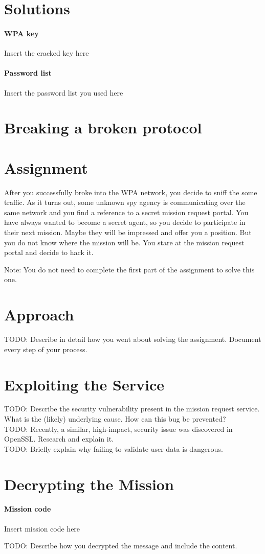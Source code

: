 \documentclass{scrartcl}
\newcommand\solution[2]{{\paragraph{#1}#2}}
\newcommand\todo[1]{TODO: #1}
\begin{document}
\section*{Solutions}
\solution{WPA key}{Insert the cracked key here}
\solution{Password list}{Insert the password list you used here}


\newpage

\section{Breaking a broken protocol}

\section*{Assignment}
After you successfully broke into the WPA network, you decide to sniff the some traffic.
As it turns out, some unknown spy agency is communicating over the same network and you find a 
reference to a secret mission request portal. You have always wanted to become a secret
agent, so you decide to participate in their next mission. Maybe they will be impressed and offer you a position.
But you do not know where the mission will be. You stare at the mission request portal and decide to hack it.

Note: You do not need to complete the first part of the assignment to solve this one.

\section*{Approach}
\todo{Describe in detail how you went about solving the assignment. Document every step of your process.}

\section*{Exploiting the Service}
\todo{Describe the security vulnerability present in the mission request service. What is the (likely) underlying cause. How can this bug be prevented?}\\
\todo{Recently, a similar, high-impact, security issue was discovered in OpenSSL. Research and explain it.}\\
\todo{Briefly explain why failing to validate user data is dangerous.}

\section*{Decrypting the Mission}
\solution{Mission code}{Insert mission code here}

\todo{Describe how you decrypted the message and include the content.}
\end{document}
